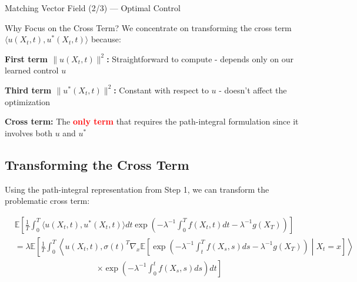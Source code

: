 \documentclass[aspectratio=169,xcolor=dvipsnames]{beamer}
\begin{document}
\begin{frame}[allowframebreaks]{Matching Vector Field (2/3) — Optimal Control}
        \begin{block}{Why Focus on the Cross Term?}
        We concentrate on transforming the cross term $\langle u(X_t,t), u^*(X_t,t)\rangle$ because:
        
        \vspace{0.3cm}
        
        \textbf{First term $\|u(X_t,t)\|^2$:} Straightforward to compute - depends only on our learned control $u$
        
        \vspace{0.3cm}
        
        \textbf{Third term $\|u^*(X_t,t)\|^2$:} Constant with respect to $u$ - doesn't affect the optimization
        
        \vspace{0.3cm}
        
        \textbf{Cross term:} The \textcolor{red}{\textbf{only term}} that requires the path-integral formulation since it involves both $u$ and $u^*$
    \end{block}

    \vspace{0.5cm}
    
    \subsection*{Transforming the Cross Term}
    
    Using the path-integral representation from Step 1, we can transform the problematic cross term:
    
    \begin{equation}
    \begin{aligned}
    &\mathbb{E}\left[\frac{1}{T}\int_0^T \langle u(X_t,t), u^*(X_t,t)\rangle dt \exp\left(-\lambda^{-1}\int_0^T f(X_t,t) dt - \lambda^{-1}g(X_T)\right)\right] \\[8pt]
    &= \lambda \mathbb{E}\left[\frac{1}{T}\int_0^T \left\langle u(X_t,t), \sigma(t)^T \nabla_x \mathbb{E}\left[\exp\left(-\lambda^{-1}\int_t^T f(X_s,s) ds - \lambda^{-1}g(X_T)\right) \middle| X_t = x\right]\right\rangle \right. \\[4pt]
    &\qquad\qquad\qquad\qquad\qquad \left. \times \exp\left(-\lambda^{-1}\int_0^t f(X_s,s) ds\right) dt\right]
    \end{aligned}
    \end{equation}
    
    \vspace{0.5cm}
    

\end{frame}
\end{document}
